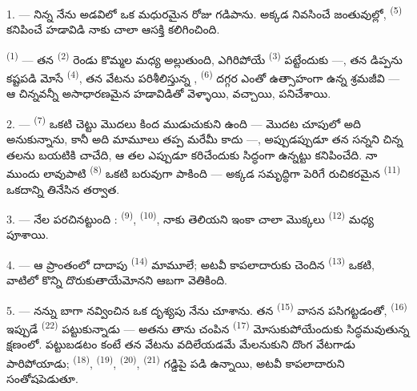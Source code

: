 \VUsaut{6.0mm}
\VUsaut{3.6mm}

\VUsaut{4.0mm}

1. --- నిన్న నేను అడవిలో ఒక మధురమైన రోజు గడిపాను. అక్కడ నివసించే జంతువుల్లో,
 \textsuperscript{(5)} కనిపించే హడావిడి నాకు చాలా ఆసక్తి కలిగించింది.

 \textsuperscript{(1)} — తన  \textsuperscript{(2)} రెండు
కొమ్మల మధ్య అల్లుతుంది, ఎగిరిపోయే  \textsuperscript{(3)} పట్టేందుకు —, తన
డిప్పను కష్టపడి మోసే  \textsuperscript{(4)}, తన వేటను పరిశీలిస్తున్న
,  \textsuperscript{(6)} దగ్గర ఎంతో ఉత్సాహంగా
ఉన్న శ్రమజీవి  — ఆ చిన్నవన్నీ అసాధారణమైన హడావిడితో వెళ్ళాయి, వచ్చాయి,
పనిచేశాయి.

2. ---  \textsuperscript{(7)} ఒకటి చెట్టు మొదలు కింద ముడుచుకుని ఉంది — మొదట
చూపులో అది  అనుకున్నాను, కానీ అది మామూలు  తప్ప
మరేమీ కాదు —, అప్పుడప్పుడూ తన సన్నని చిన్న తలను బయటికి చాచేది, ఆ తల ఎప్పుడూ కరిచేందుకు
సిద్ధంగా ఉన్నట్టు కనిపించేది. నా ముందు లావుపాటి 
\textsuperscript{(8)} ఒకటి బరువుగా పాకింది — అక్కడ సమృద్ధిగా పెరిగే రుచికరమైన
 \textsuperscript{(11)} ఒకదాన్ని తినేసిన తర్వాత.

3. --- నేల  పరచినట్టుంది : 
\textsuperscript{(9)},  \textsuperscript{(10)}, నాకు తెలియని ఇంకా చాలా
మొక్కలు  \textsuperscript{(12)} మధ్య పూశాయి.

4. --- ఆ ప్రాంతంలో  దాదాపు  \textsuperscript{(14)}
మామూలే; అటవీ కాపలాదారుకు చెందిన  \textsuperscript{(13)} ఒకటి, వాటిలో
కొన్ని దొరుకుతాయేమోనని ఆబగా వెతికింది.

\VUsaut{5.0mm}
\VUsaut{3.4mm}

5. --- నన్ను బాగా నవ్వించిన ఒక దృశ్యపు  నేను చూశాను. తన
 \textsuperscript{(15)} వాసన పసిగట్టడంతో, 
\textsuperscript{(16)} ఇప్పుడే  \textsuperscript{(22)} పట్టుకున్నాడు —
అతను తాను చంపిన  \textsuperscript{(17)} మోసుకుపోయేందుకు సిద్ధమవుతున్న
క్షణంలో. పట్టుబడటం కంటే తన వేటను వదిలేయడమే మేలనుకుని దొంగ వేటగాడు పారిపోయాడు;
 \textsuperscript{(18)},  \textsuperscript{(19)},
 \textsuperscript{(20)},  \textsuperscript{(21)} గడ్డిపై
పడి ఉన్నాయి, అటవీ కాపలాదారుని సంతోషపెడుతూ.

